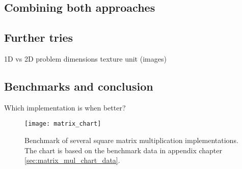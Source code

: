 \subsection{Combining both approaches}



\subsection{Further tries}
1D vs 2D problem dimensions
texture unit (images)


\subsection{Benchmarks and conclusion}
Which implementation is when better?


\begin{figure}
	\centering
	\texttt{[image: matrix\_chart]}
	\caption{Benchmark of several square matrix multiplication implementations. The chart is based on the benchmark data in appendix chapter \ref{sec:matrix_mul_chart_data}.}
	\label{fig:matrix_chart}
\end{figure}

